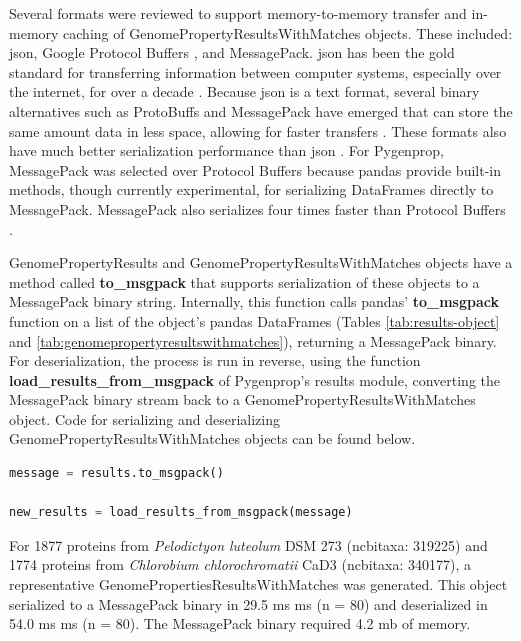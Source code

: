Several formats were reviewed to support memory-to-memory transfer and in-memory 
caching of GenomePropertyResultsWithMatches objects. These included: \gls{json}, 
Google Protocol Buffers \cite{varda2008protocol}, and MessagePack. \gls{json} 
has been the gold standard for transferring information between computer 
systems, especially over the internet, for over a decade 
\cite{d4_softwareltd_2017}. Because \gls{json} is a text format, several binary 
alternatives such as ProtoBuffs and MessagePack have emerged that can store the 
same amount data in less space, allowing for faster transfers 
\cite{furuhashi2013messagepack,varda2008protocol,krebs_2017,cooper_2010,bengtsson_24AD}. 
These formats also have much better serialization performance than \gls{json} 
\cite{krebs_2017,cooper_2010,bengtsson_24AD}. For Pygenprop, MessagePack was 
selected over Protocol Buffers because pandas provide built-in methods, though 
currently experimental, for serializing DataFrames directly to MessagePack. 
MessagePack also serializes four times faster than Protocol Buffers 
\cite{cooper_2010}.

GenomePropertyResults and GenomePropertyResultsWithMatches objects have a method 
called \textbf{to\_msgpack} that supports serialization of these objects to a 
MessagePack binary string. Internally, this function calls pandas' 
\textbf{to\_msgpack} function on a list of the object's pandas DataFrames 
(Tables \ref{tab:results-object} and 
\ref{tab:genomepropertyresultswithmatches}), returning a MessagePack binary. For 
deserialization, the process is run in reverse, using the function 
\textbf{load\_results\_from\_msgpack} of Pygenprop's results module, converting 
the MessagePack binary stream back to a GenomePropertyResultsWithMatches object. 
Code for serializing and deserializing GenomePropertyResultsWithMatches objects 
can be found below.

\FloatBarrier
\begin{lstlisting}[language=Python]  
message = results.to_msgpack()

new_results = load_results_from_msgpack(message)
\end{lstlisting}

For 1877 proteins from \textit{Pelodictyon luteolum} DSM 273 (\gls{ncbitaxa}:  
319225) and 1774 proteins from \textit{Chlorobium chlorochromatii} CaD3 
(\gls{ncbitaxa}: 340177), a representative GenomePropertiesResultsWithMatches 
was generated. This object serialized to a MessagePack binary in 29.5 ms  ms (\gls{n} = 80) and deserialized in 54.0 ms  ms (\gls{n} = 80). 
The MessagePack binary required 4.2 \gls{mb} of memory.

